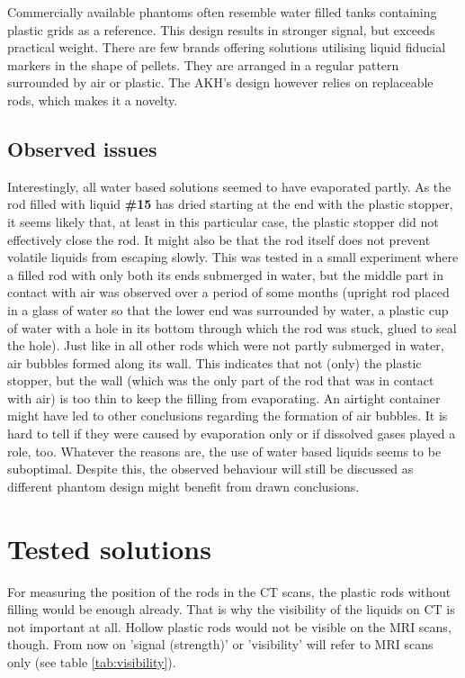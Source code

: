 Commercially available phantoms often resemble water filled tanks containing plastic grids as a reference.
This design results in stronger signal, but exceeds practical weight.
There are few brands offering solutions utilising liquid fiducial markers in the shape of pellets.
They are arranged in a regular pattern surrounded by air or plastic.
The AKH's design however relies on replaceable rods, which makes it a novelty.

\subsection{Observed issues}

Interestingly, all water based solutions seemed to have evaporated partly.
As the rod filled with liquid \textbf{\#15} has dried starting at the end with the plastic stopper, it seems likely that, at least in this particular case, the plastic stopper did not effectively close the rod.
It might also be that the rod itself does not prevent volatile liquids from escaping slowly.
This was tested in a small experiment where a filled rod with only both its ends submerged in water, but the middle part in contact with air was observed over a period of some months (upright rod placed in a glass of water so that the lower end was surrounded by water, a plastic cup of water with a hole in its bottom through which the rod was stuck, glued to seal the hole).
Just like in all other rods which were not partly submerged in water, air bubbles formed along its wall.
This indicates that not (only) the plastic stopper, but the wall (which was the only part of the rod that was in contact with air) is too thin to keep the filling from evaporating.
An airtight container might have led to other conclusions regarding the formation of air bubbles.
It is hard to tell if they were caused by evaporation only or if dissolved gases played a role, too.
Whatever the reasons are, the use of water based liquids seems to be suboptimal.
Despite this, the observed behaviour will still be discussed as different phantom design might benefit from drawn conclusions.

\section{Tested solutions}

For measuring the position of the rods in the CT scans, the plastic rods without filling would be enough already.
That is why the visibility of the liquids on CT is not important at all.
Hollow plastic rods would not be visible on the MRI scans, though.
From now on 'signal (strength)' or 'visibility' will refer to MRI scans only (see table \ref{tab:visibility}).

